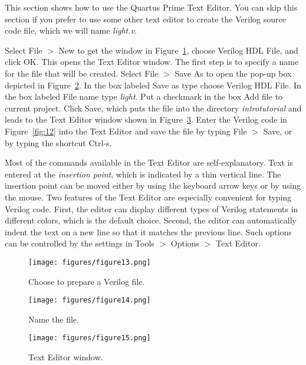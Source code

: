 \noindent 
This section shows how to use the Quartus Prime Text Editor.
You can skip this section if you prefer to use some other text editor
to create the Verilog source code file, which we will name {\it light.v}. 

Select {\sf File $>$ New} to get the window in Figure~\ref{fig:13}, 
choose {\sf Verilog HDL File}, and click {\sf OK}. 
This opens the Text Editor window. 
The first step is to specify a name
for the file that will be created. Select {\sf File $>$ Save As}
to open the pop-up box depicted in Figure~\ref{fig:14}. 
In the box labeled {\sf Save as type} choose {\sf Verilog HDL File}.
In the box labeled {\sf File name} type {\it light}.
Put a checkmark in the box {\sf Add file to current project}.
Click {\sf Save}, which puts the file into the directory
{\it introtutorial} and leads to the Text Editor window shown
in Figure~\ref{fig:15}. 
Enter the Verilog code in Figure~\ref{fig:12}
into the Text Editor and save the file by typing {\sf File $>$ Save}, or by typing 
the shortcut {\sf Ctrl-s}.

Most of the commands available in the Text Editor are self-explanatory. 
Text is entered at the {\it insertion point}, which is indicated by a thin
vertical line. The insertion point can be moved either by using the
keyboard arrow keys or by using the mouse. Two features of 
the Text Editor are especially convenient for typing Verilog
code. First, the editor can display different types of Verilog
statements in different colors, which is the default choice. 
Second, the editor can automatically
indent the text on a new line so that it matches the previous line. 
Such options can be controlled by the settings 
in {\sf Tools $>$ Options $>$ Text Editor}.

\begin{figure}[H]
   \begin{center}
      \texttt{[image: figures/figure13.png]}
   \caption{Choose to prepare a Verilog file.} 
	 \label{fig:13}
	 \end{center}
\end{figure}

\begin{figure}[H]
   \begin{center}
      \texttt{[image: figures/figure14.png]}
   \caption{Name the file.} 
	 \label{fig:14}
	 \end{center}
\end{figure}

\begin{figure}[H]
   \begin{center}
      \texttt{[image: figures/figure15.png]}
   \caption{Text Editor window.} 
	 \label{fig:15}
	 \end{center}
\end{figure}

